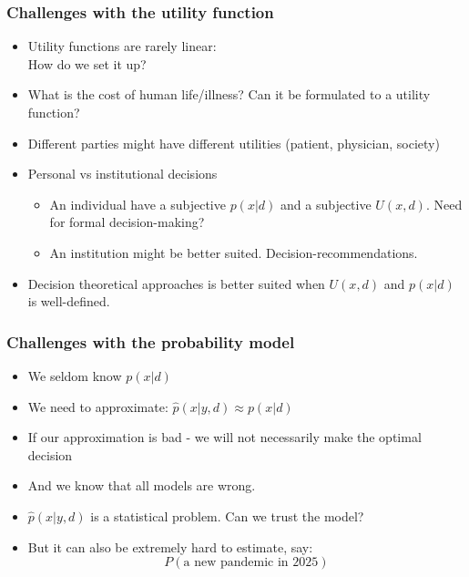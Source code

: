 \documentclass[10pt]{beamer}
\begin{document}
\begin{frame}
\frametitle{Challenges with the utility function}

  \begin{itemize}
  \item Utility functions are rarely linear: \\How do we set it up?
  \pause
  \item What is the cost of human life/illness? Can it be formulated to a utility function?
  \pause
  \item Different parties might have different utilities (patient, physician, society)
  \pause
  \item Personal vs institutional decisions
  \begin{itemize}
     \item An individual have a subjective $p(x|d)$ and a subjective $U(x, d)$. Need for formal decision-making?
     \item An institution might be better suited. Decision-recommendations.
  \end{itemize}
  \item Decision theoretical approaches is better suited when $U(x,d)$ and $p(x|d)$ is well-defined.
  \end{itemize}
\end{frame}

\begin{frame}
\frametitle{Challenges with the probability model}

  \begin{itemize}
  \item We seldom know $p(x|d)$
  \pause
  \item We need to approximate: $\hat{p}(x|y,d) \approx p(x|d)$
  \pause
  \item If our approximation is bad - we will not necessarily make the optimal decision
  \item And we know that all models are wrong.
  \pause
  \item $\hat{p}(x|y,d)$ is a statistical problem. Can we trust the model?
  \item But it can also be extremely hard to estimate, say:
  \[
  P(\text{a new pandemic in 2025})
  \]
  \end{itemize}

\end{frame}
\end{document}
